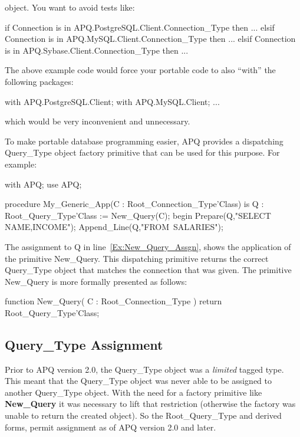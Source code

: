 \documentclass[english,letterpaper]{book}
\begin{document}
object. You want to avoid tests like:

\begin{Example}

if Connection is in APQ.PostgreSQL.Client.Connection_Type then
   ...
elsif Connection is in APQ.MySQL.Client.Connection_Type then
   ...
elsif Connection is in APQ.Sybase.Client.Connection_Type then
   ...

\end{Example}

The above example code would force your portable code to also ``with''
the following packages:

\begin{Example}
with APQ.PostgreSQL.Client;
with APQ.MySQL.Client;
...
\end{Example}

which would be very inconvenient and unnecessary.

To make portable database programming easier, APQ provides a dispatching
Query\_Type object factory primitive that can be used for this purpose.
For example:

\begin{NumberedExample}
with APQ;
use APQ;

procedure My_Generic_App(C : Root_Connection_Type'Class) is
   Q : Root_Query_Type'Class := New_Query(C);\label{Ex:New_Query_Assgn}
begin
   Prepare(Q,"SELECT NAME,INCOME");
   Append_Line(Q,"FROM~SALARIES");
\end{NumberedExample}

The assignment to Q in line~\ref{Ex:New_Query_Assgn}, shows the
application of the primitive New\_Query. This dispatching
primitive returns the correct Query\_Type object that matches the
connection that was given. The primitive New\_Query is more formally
presented as follows:

\begin{Code}
function New_Query(
   C : Root_Connection_Type
) return Root_Query_Type'Class;
\end{Code}

\subsection{Query\_Type Assignment\label{Query_Type Cloning}}

Prior to APQ version 2.0, the Query\_Type object was a \emph{limited}
tagged type. This meant that the Query\_Type object was never able
to be assigned to another Query\_Type object. With the need for a
factory primitive like \textbf{New\_Query} it was necessary to lift
that restriction (otherwise the factory was unable to return the created
object). So the Root\_Query\_Type and derived forms, permit assignment
as of APQ version 2.0 and later.
\end{document}
